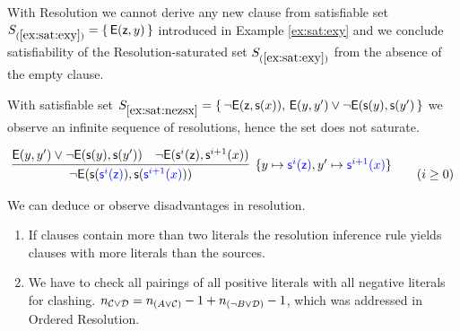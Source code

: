\begin{example}
	With Resolution we cannot derive any new clause from satisfiable set 
	$S_{(\ref{ex:sat:exy})  } = \{\,{\mathsf{E}}({\mathsf z},y)\,\}$ 
	introduced in Example \ref{ex:sat:exy} and we conclude satisfiability 
	of the Resolution-saturated set $S_{(\ref{ex:sat:exy})  }$ from the absence of the empty clause.
\end{example}

\begin{example}\label{ex:sat:nezsx}
	With satisfiable set $S_{\ref{ex:sat:nezsx}} = \{\, 
		\lnot{\mathsf{E}}({\mathsf z},{\mathsf s}(x)),\, {\mathsf{E}}(y,y') \lor \lnot {\mathsf{E}}({\mathsf s}(y),{\mathsf s}(y')
		\,\}$
		we observe an infinite sequence of resolutions,
		hence the set does not saturate.
		
	\begin{gather*}
	\infer
	[\{y\mapsto{\colN\msucc^i(\mzero)}, y'\mapsto{\colN\msucc^{i+1}(x)}\}]
	{
		\lnot \mE(\msucc({\colN\msucc^{i}(\mzero)}),\msucc({\colN\msucc^{i+1}(x)})) 
	}{
		{\mE(y,y')} \lor \lnot \mE(\msucc(y),\msucc(y')) 
		&{ \lnot\mE(\msucc^i(\mzero),\msucc^{i+1}(x))}
	}
	\tag{$i\geq 0$}
	\\
	\end{gather*}
\end{example}

We can deduce or observe disadvantages in resolution. 

\begin{enumerate}
	\item If clauses contain more than two literals the resolution inference rule yields clauses with more literals than the sources.
	\item We have to check all pairings 
	of all positive literals with all negative literals for clashing.
	$n_{{\mathcal C}\lor{\mathcal D}} = n_{(A\lor{\mathcal C})} -1 + n_{(\lnot B\lor{\mathcal D})}-1$,
	which was addressed in Ordered Resolution.
\end{enumerate}

